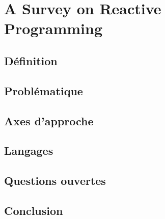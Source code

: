 \documentclass[11pt]{article}
\begin{document}
{\centering
\section*{A Survey on Reactive Programming}}
\begin{multicols}{2}
\subsection*{Définition}

\subsection*{Problématique}

\subsection*{Axes d'approche}

\subsection*{Langages}

\subsection*{Questions ouvertes}

\subsection*{Conclusion}

\end{multicols}
\end{document}
